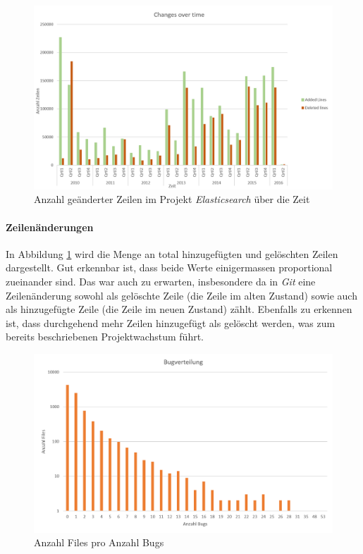 \documentclass[10pt, a4paper]{article}
\begin{document}
\begin{figure}[!ht]
	\centering
	\includegraphics[width=1\textwidth]{resources/images/chart_changed_lines_over_time.png}
	\caption{Anzahl geänderter Zeilen im Projekt \emph{Elasticsearch} über die Zeit}
	\label{changedlinesovertime}
\end{figure}

\paragraph{Zeilenänderungen}
In Abbildung \ref{changedlinesovertime} wird die Menge an total hinzugefügten und gelöschten Zeilen dargestellt. Gut erkennbar ist, dass beide Werte einigermassen proportional zueinander sind. Das war auch zu erwarten, insbesondere da in \emph{Git} eine Zeilenänderung sowohl als gelöschte Zeile (die Zeile im alten Zustand) sowie auch als hinzugefügte Zeile (die Zeile im neuen Zustand) zählt.
Ebenfalls zu erkennen ist, dass durchgehend mehr Zeilen hinzugefügt als gelöscht werden, was zum bereits beschriebenen Projektwachstum führt.

\begin{figure}[!ht]
	\centering
	\includegraphics[width=1\textwidth]{resources/images/chart_bug_distribution.png}
	\caption{Anzahl Files pro Anzahl Bugs}
	\label{fig:filecountperbugs}
\end{figure}
\end{document}
